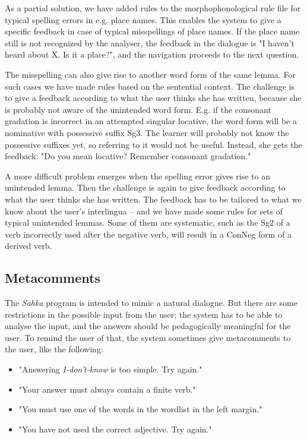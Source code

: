 \documentclass[11pt]{article}
\begin{document}
As a partial solution, we have added rules to the morphophonological rule file for typical spelling errors in e.g. place names. This enables the system to give a specific feedback in case of typical misspellings of place names. If the place name still is not recognized by the analyser, the feedback in the dialogue is "I haven't heard about X. Is it a place?", and the navigation proceeds to the next question.

The misspelling can also give rise to another word form of the same lemma. For such cases we have made rules based on the sentential context. The challenge is to give a feedback according to what the user thinks she has written, because she is probably not aware of the unintended word form. E.g. if the consonant gradation is incorrect in an attempted singular locative, the word form will be a nominative with possessive suffix Sg3. The learner will probably not know the possessive suffixes yet, so referring to it would not be useful. Instead, she gets the feedback: "Do you mean locative? Remember consonant gradation." 

A more difficult problem emerges when the spelling error gives rise to an unintended lemma. Then the challenge is again to give feedback according to what the user thinks she has written. The feedback has to be tailored to what we know about the user's interlingua -- and we have made some rules for sets of typical unintended lemmas. Some of them are systematic, such as the Sg2 of a verb incorrectly used after the negative verb, will result in a ConNeg form of a derived verb.  


\subsection{Metacomments}
The \textit{Sahka} program is intended to mimic a natural dialogue. But there are some restrictions in the possible input from the user; the system has to be able to analyse the input, and the answers should be pedagogically meaningful for the user. To remind the user of that, the system sometimes give metacomments to the user, like the following:
\begin{itemize}
\setlength{\itemsep}{-0.2cm}
\item "Answering \textit{I-don't-know} is too simple. Try again."
\item "Your answer must always contain a finite verb."
\item "You must use one of the words in the wordlist in the left margin."
\item "You have not used the correct adjective. Try again."
\end{itemize}
\end{document}
